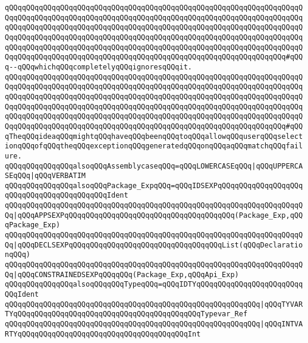 \verb|qQQqqQQqqQQqqQQqqQQqqQQqqQQqqQQqqQQqqQQqqQQqqQQqqQQqqQQqqQQqqQQqqQQqqQQqqQQqqQQqqQQqqQQqqQQqqQQqqQQqqQQqqQQqqQQqqQQqqQQqqQQqqQQqqQQqqQQqqQQqqQQqqQQqqQQqqQQqqQQqqQQqqQQqqQQqqQQqqQQqqQQqqQQqqQQqqQQqqQQqqQQqqQQqqQQqqQQqqQQqqQQqqQQqqQQqqQQqqQQqqQQqqQQqqQQqqQQqqQQqqQQqqQQqqQQqqQQqqQQqqQQqqQQqqQQqqQQqqQQqqQQqqQQqqQQqqQQqqQQqqQQqqQQqqQQqqQQqqQQqqQQqqQQqqQQqqQQqqQQqqQQqqQQqqQQqqQQqqQQqqQQqqQQqqQQqqQQqqQQqqQQqqQQqqQQqqQQq#qQQq--qQQqwhichqQQqcompletelyqQQqignoresqQQqit.|\newline
\verb|qQQqqQQqqQQqqQQqqQQqqQQqqQQqqQQqqQQqqQQqqQQqqQQqqQQqqQQqqQQqqQQqqQQqqQQqqQQqqQQqqQQqqQQqqQQqqQQqqQQqqQQqqQQqqQQqqQQqqQQqqQQqqQQqqQQqqQQqqQQqqQQqqQQqqQQqqQQqqQQqqQQqqQQqqQQqqQQqqQQqqQQqqQQqqQQqqQQqqQQqqQQqqQQqqQQqqQQqqQQqqQQqqQQqqQQqqQQqqQQqqQQqqQQqqQQqqQQqqQQqqQQqqQQqqQQqqQQqqQQqqQQqqQQqqQQqqQQqqQQqqQQqqQQqqQQqqQQqqQQqqQQqqQQqqQQqqQQqqQQqqQQqqQQqqQQqqQQqqQQqqQQqqQQqqQQqqQQqqQQqqQQqqQQqqQQqqQQqqQQqqQQqqQQqqQQqqQQq#qQQqTheqQQqideaqQQqmightqQQqhaveqQQqbeenqQQqtoqQQqallowqQQquserqQQqselectionqQQqofqQQqtheqQQqexceptionqQQqgeneratedqQQqonqQQqaqQQqmatchqQQqfailure.|\newline
\newline
\verb|qQQqqQQqqQQqqQQqalsoqQQqAssemblycaseqQQq=qQQqLOWERCASEqQQq|\verb#|qQQqUPPERCASEqQQq|qQQqVERBATIM#\newline
\newline
\verb|qQQqqQQqqQQqqQQqalsoqQQqPackage_ExpqQQq=qQQqIDSEXPqQQqqQQqqQQqqQQqqQQqqQQqqQQqqQQqqQQqqQQqqQQqIdent|\newline
\verb|qQQqqQQqqQQqqQQqqQQqqQQqqQQqqQQqqQQqqQQqqQQqqQQqqQQqqQQqqQQqqQQqqQQqqQQq|\verb#|qQQqAPPSEXPqQQqqQQqqQQqqQQqqQQqqQQqqQQqqQQqqQQqqQQq(Package_Exp,qQQqPackage_Exp)#\newline
\verb|qQQqqQQqqQQqqQQqqQQqqQQqqQQqqQQqqQQqqQQqqQQqqQQqqQQqqQQqqQQqqQQqqQQqqQQq|\verb#|qQQqDECLSEXPqQQqqQQqqQQqqQQqqQQqqQQqqQQqqQQqqQQqList(qQQqDeclarationqQQq)#\newline
\verb|qQQqqQQqqQQqqQQqqQQqqQQqqQQqqQQqqQQqqQQqqQQqqQQqqQQqqQQqqQQqqQQqqQQqqQQq|\verb#|qQQqCONSTRAINEDSEXPqQQqqQQq(Package_Exp,qQQqApi_Exp)#\newline
\newline
\verb|qQQqqQQqqQQqqQQqalsoqQQqqQQqTypeqQQq=qQQqIDTYqQQqqQQqqQQqqQQqqQQqqQQqqQQqIdent|\newline
\verb|qQQqqQQqqQQqqQQqqQQqqQQqqQQqqQQqqQQqqQQqqQQqqQQqqQQqqQQqqQQq|\verb#|qQQqTYVARTYqQQqqQQqqQQqqQQqqQQqqQQqqQQqqQQqqQQqqQQqqQQqTypevar_Ref#\newline
\verb|qQQqqQQqqQQqqQQqqQQqqQQqqQQqqQQqqQQqqQQqqQQqqQQqqQQqqQQqqQQq|\verb#|qQQqINTVARTYqQQqqQQqqQQqqQQqqQQqqQQqqQQqqQQqqQQqqQQqInt#\newline
